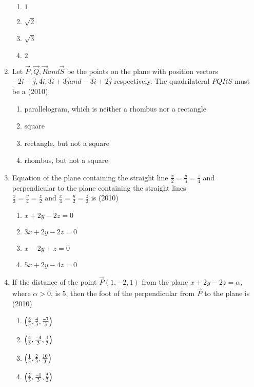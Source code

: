 \documentclass[journal,12pt,onecolumn]{IEEEtran}
\theoremstyle{remark}
\begin{document}
\begin{enumerate}
\begin{multicols}{2}
    \begin{enumerate}
    \item $1$
    \item $\sqrt{2}$
    \item $\sqrt{3}$
    \item $2$
    \end{enumerate}
    \end{multicols}
    \item Let $\vec{P}, \vec{Q}, \vec{R} and \vec{S}$ be the points on the plane with position vectors $-2\hat{i} -\hat{j},4\hat{i},3\hat{i}+3\hat{j} and -3\hat{i}+2\hat{j}$ respectively. The quadrilateral $PQRS$ must be a 
    \hfill{(2010)}
    \begin{enumerate}
    \item parallelogram, which is neither a rhombus nor a rectangle 
    \item square 
    \item rectangle, but not a square
    \item rhombus, but not a square 
    \end{enumerate}
    \item Equation of the plane containing the straight line $\frac{x}{2}=\frac{y}{3}=\frac{z}{4}$ and perpendicular to the plane containing the straight lines $\frac{x}{3}=\frac{y}{4}=\frac{z}{2} \text{ and } \frac{x}{4}=\frac{y}{2}=\frac{z}{3}$ is 
    \hfill{(2010)}
    \begin{enumerate}
    \item $x+2y-2z=0$
    \item $3x+2y-2z=0$
    \item $x-2y+z=0$
    \item $5x+2y-4z=0$
    \end{enumerate}
    \item If the distance of the point $\vec{P}(1,-2,1)$ from the plane $x+2y-2z=\alpha$, where $\alpha>0$, is $5$, then the foot of the perpendicular from $\vec{P}$ to the plane is
    \hfill{(2010)}
    \begin{enumerate}
    \item $\left(\frac{8}{3}, \frac{4}{3}, \frac{-7}{3}\right)$
    \item $\left(\frac{4}{3}, \frac{-4}{3}, \frac{1}{3}\right)$
    \item $\left(\frac{1}{3}, \frac{2}{3}, \frac{10}{3}\right)$
    \item $\left(\frac{2}{3}, \frac{-1}{3}, \frac{5}{2}\right)$
    \end{enumerate}
\end{enumerate}
\end{document}
